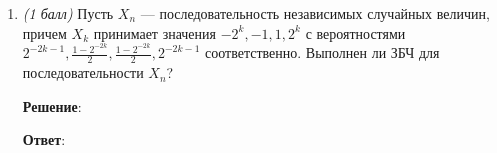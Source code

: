 \documentclass{article}
\begin{document}
\begin{enumerate}
\item \textit{(1 балл)} Пусть ${X_n}$ — последовательность независимых случайных величин, причем $X_k$ принимает значения $-2^k, -1, 1, 2^k$ с вероятностями $2^{-2k-1},\frac{1-2^{-2k}}{2},\frac{1-2^{-2k}}{2}, 2^{-2k-1}$ соответственно. Выполнен ли ЗБЧ для последовательности ${X_n}$?

\textbf{Решение}:


\textbf{Ответ}:





\end{enumerate}
\end{document}
